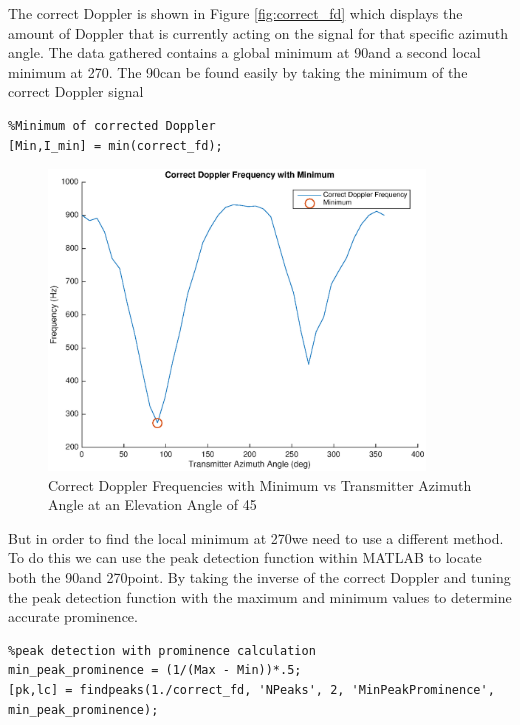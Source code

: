 The correct Doppler is shown in Figure \ref{fig:correct_fd} which displays the amount of Doppler that is currently acting on the signal for that specific azimuth angle. The data gathered contains a global minimum at 90\textdegree \space and a second local minimum at 270\textdegree. The 90\textdegree \space can be found easily by taking the minimum of the correct Doppler signal

\begin{lstlisting}
%Minimum of corrected Doppler
[Min,I_min] = min(correct_fd);
\end{lstlisting}

\begin{figure}
	\begin{center}
		\includegraphics[width=10cm]{images/results/Correct_doppler_with_Minumum.eps}
		\caption{Correct Doppler Frequencies with Minimum vs Transmitter Azimuth Angle at an Elevation Angle of 45\textdegree}
		\label{fig:min_correct_fd}
	\end{center}
\end{figure}

But in order to find the local minimum at 270\textdegree \space we need to use a different method. To do this we can use the peak detection function within MATLAB to locate both the 90\textdegree \space and 270\textdegree \space point. By taking the inverse of the correct Doppler and tuning the peak detection function with the maximum and minimum values to determine accurate prominence.

\begin{lstlisting}
%peak detection with prominence calculation
min_peak_prominence = (1/(Max - Min))*.5;
[pk,lc] = findpeaks(1./correct_fd, 'NPeaks', 2, 'MinPeakProminence', min_peak_prominence);
\end{lstlisting}


